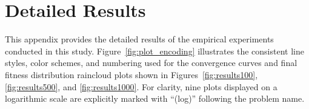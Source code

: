 \chapter{Detailed Results}\label{app:detailed_results}


This appendix provides the detailed results of the empirical experiments conducted in this study. Figure~\ref{fig:plot_encoding} illustrates the consistent line styles, color schemes, and numbering used for the convergence curves and final fitness distribution raincloud plots shown in Figures~\ref{fig:results100}, \ref{fig:results500}, and \ref{fig:results1000}. For clarity, nine plots displayed on a logarithmic scale are explicitly marked with “(log)” following the problem name.

\vfill

\vspace{.875em}
